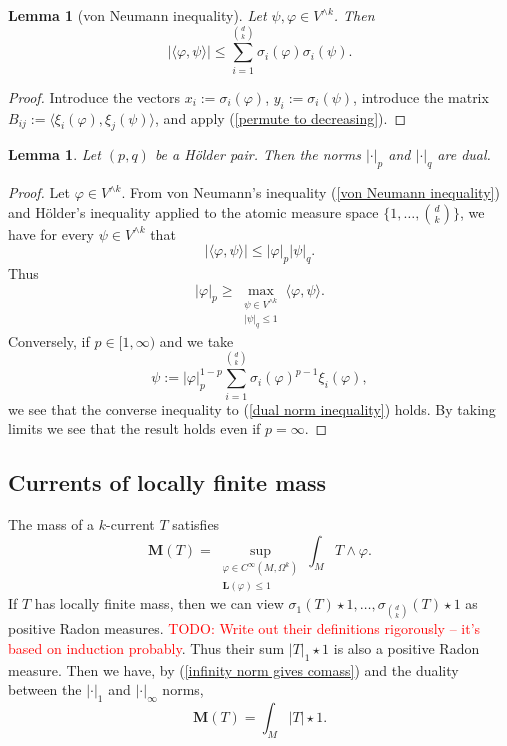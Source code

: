 \documentclass[reqno,11pt]{amsart}
\newcommand{\Mass}{\mathbf M}
\newcommand{\Comass}{\mathbf L}
\newtheorem{lemma}[theorem]{Lemma}
\theoremstyle{definition}
\numberwithin{equation}{section}
\newcommand\todo[1]{\textcolor{red}{TODO: #1}}
\begin{document}
\begin{lemma}[von Neumann inequality]
Let $\psi, \varphi \in V^{\wedge k}$.
Then
\begin{equation}\label{von Neumann inequality}
|\langle \varphi, \psi\rangle| \leq \sum_{i=1}^{\binom dk} \sigma_i(\varphi) \sigma_i(\psi).
\end{equation}
\end{lemma}
\begin{proof}
Introduce the vectors $x_i := \sigma_i(\varphi)$, $y_i := \sigma_i(\psi)$, introduce the matrix $B_{ij} := \langle \xi_i(\varphi), \xi_j(\psi)\rangle$, and apply (\ref{permute to decreasing}).
\end{proof}

\begin{lemma}
Let $(p, q)$ be a H\"older pair. Then the norms $|\cdot|_p$ and $|\cdot|_q$ are dual.
\end{lemma}
\begin{proof}
Let $\varphi \in V^{\wedge k}$.
From von Neumann's inequality (\ref{von Neumann inequality}) and H\"older's inequality applied to the atomic measure space $\{1, \dots, \binom dk\}$, we have for every $\psi \in V^{\wedge k}$ that
$$|\langle \varphi, \psi\rangle| \leq |\varphi|_p |\psi|_q.$$
Thus 
\begin{equation}\label{dual norm inequality}
|\varphi|_p \geq \max_{\substack{\psi \in V^{\wedge k} \\ |\psi|_q \leq 1}} \langle \varphi, \psi\rangle.
\end{equation}
Conversely, if $p \in [1, \infty)$ and we take
$$\psi := |\varphi|_p^{1 - p} \sum_{i=1}^{\binom dk} \sigma_i(\varphi)^{p - 1} \xi_i(\varphi),$$
we see that the converse inequality to (\ref{dual norm inequality}) holds.
By taking limits we see that the result holds even if $p = \infty$.
\end{proof}

\subsection{Currents of locally finite mass}
The mass of a $k$-current $T$ satisfies 
$$\Mass(T) = \sup_{\substack{\varphi \in C^\infty(M, \Omega^k) \\ \Comass(\varphi) \leq 1}} \int_M T \wedge \varphi.$$
If $T$ has locally finite mass, then we can view $\sigma_1(T) \star 1, \dots, \sigma_{\binom dk}(T) \star 1$ as positive Radon measures. \todo{Write out their definitions rigorously -- it's based on induction probably}.
Thus their sum $|T|_1 \star 1$ is also a positive Radon measure.
Then we have, by (\ref{infinity norm gives comass}) and the duality between the $|\cdot|_1$ and $|\cdot|_\infty$ norms,
$$\Mass(T) = \int_M |T| \star 1.$$
\end{document}
